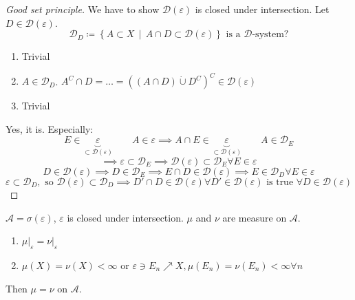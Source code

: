 \documentclass[a4paper]{article}
\numberwithin{lecref}{section}
\theoremstyle{break}
\newcommand{\SetDef}[2]{\left\{#1\,\mid\,#2\right\}}
\begin{document}
\begin{proof}[Good set principle]
  We have to show $\mathcal D(\varepsilon)$ is closed under intersection. Let $D \in \mathcal D(\varepsilon)$.
  \[ \mathcal D_D \coloneqq \SetDef{A \subset X}{A \cap D \subset \mathcal D(\varepsilon)} \text{ is a $\mathcal D$-system?} \]
  \begin{enumerate}
    \item Trivial
    \item $A \in \mathcal D_D$. $A^C \cap D = \dots = \left((A \cap D) \dot\cup D^C\right)^C \in \mathcal D(\varepsilon)$
    \item Trivial
  \end{enumerate}
  Yes, it is. Especially:
  \[ E \in \underbrace{\varepsilon}_{\subset \mathcal D(\varepsilon)} \qquad A \in \varepsilon \implies A \cap E \in \underbrace{\varepsilon}_{\subset \mathcal D(\varepsilon)} \qquad A \in \mathcal D_E \]
  \[ \implies \varepsilon \subset \mathcal D_E \implies \mathcal D(\varepsilon) \subset \mathcal D_E \forall E \in \varepsilon \]
  \[ D \in \mathcal D(\varepsilon) \implies D \in \mathcal D_E \implies E \cap D \in \mathcal D(\varepsilon) \implies E \in \mathcal D_D \forall E \in \varepsilon \]
  \[ \varepsilon \subset \mathcal D_D, \text{ so } \mathcal D(\varepsilon) \subset \mathcal D_D \implies D' \cap D \in \mathcal D(\varepsilon) \forall D' \in \mathcal D(\varepsilon) \text{ is true } \forall D \in \mathcal D(\varepsilon) \]
\end{proof}

\begin{theorem}
  $\mathcal A = \sigma(\varepsilon)$, $\varepsilon$ is closed under intersection. $\mu$ and $\nu$ are measure on $\mathcal A$.
  \begin{enumerate}
    \item $\left.\mu\right|_{\varepsilon} = \left.\nu\right|_{\varepsilon}$
    \item $\mu(X) = \nu(X) < \infty$ or $\varepsilon \ni E_n \nearrow X, \mu(E_n) = \nu(E_n) < \infty \forall n$
  \end{enumerate}
  Then $\mu = \nu$ on $\mathcal A$.
\end{theorem}
\end{document}
